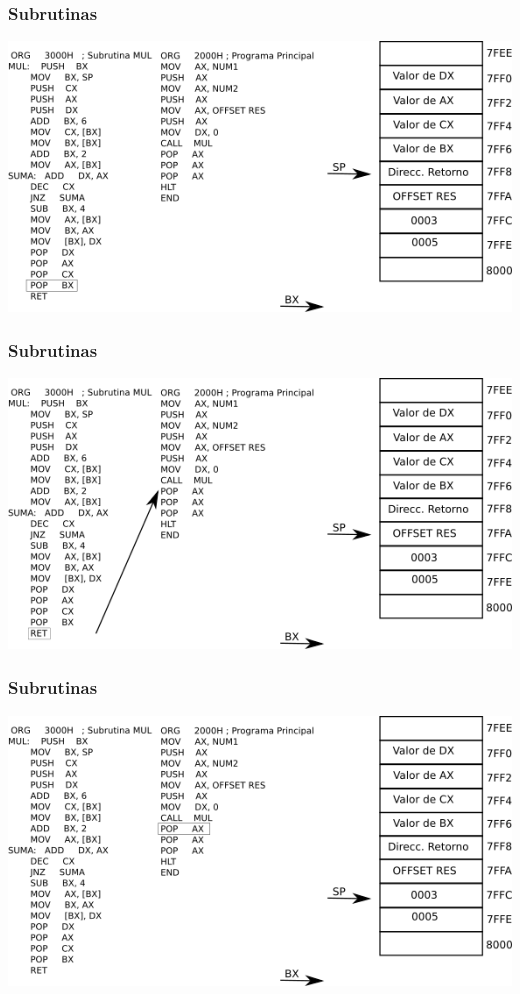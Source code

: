 \documentclass{beamer}
\begin{document}
\begin{frame}
\frametitle{Subrutinas}
\includegraphics[scale=0.70]{imgs/imagen_017.png}
\end{frame}

\begin{frame}
\frametitle{Subrutinas}
\includegraphics[scale=0.70]{imgs/imagen_018.png}
\end{frame}

\begin{frame}
\frametitle{Subrutinas}
\includegraphics[scale=0.70]{imgs/imagen_019.png}
\end{frame}
\end{document}
